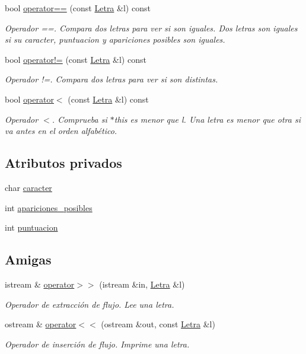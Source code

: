 \begin{DoxyCompactItemize}
bool \hyperlink{classLetra_a22103d3a6d8b9bd95c95bf5d60909b4a}{operator==} (const \hyperlink{classLetra}{Letra} \&l) const
\begin{DoxyCompactList}\small\item\em Operador ==. Compara dos letras para ver si son iguales. Dos letras son iguales si su caracter, puntuacion y apariciones posibles son iguales. \end{DoxyCompactList}\item 
bool \hyperlink{classLetra_aa9b95b0a0885994f0f7db4c4272dfe79}{operator!=} (const \hyperlink{classLetra}{Letra} \&l) const
\begin{DoxyCompactList}\small\item\em Operador !=. Compara dos letras para ver si son distintas. \end{DoxyCompactList}\item 
bool \hyperlink{classLetra_a3f648256284f628aa6fbcf63a2bf68ec}{operator$<$} (const \hyperlink{classLetra}{Letra} \&l) const
\begin{DoxyCompactList}\small\item\em Operador $<$. Comprueba si $\ast$this es menor que l. Una letra es menor que otra si va antes en el orden alfabético. \end{DoxyCompactList}\end{DoxyCompactItemize}
\subsection*{Atributos privados}
\begin{DoxyCompactItemize}
\item 
char \hyperlink{classLetra_ac279abbe29274f9de8e8a51b1f8c1f50}{caracter}
\item 
int \hyperlink{classLetra_a2aa1db254581132a0846e132ab369104}{apariciones\+\_\+posibles}
\item 
int \hyperlink{classLetra_a679c32bc028d79f633128de6c5971ae5}{puntuacion}
\end{DoxyCompactItemize}
\subsection*{Amigas}
\begin{DoxyCompactItemize}
\item 
istream \& \hyperlink{classLetra_a98ae2f1699b9cc4ef8a9300fc0a2ffe9}{operator$>$$>$} (istream \&in, \hyperlink{classLetra}{Letra} \&l)
\begin{DoxyCompactList}\small\item\em Operador de extracción de flujo. Lee una letra. \end{DoxyCompactList}\item 
ostream \& \hyperlink{classLetra_afdb7bfcba756230db41730558d5647ca}{operator$<$$<$} (ostream \&out, const \hyperlink{classLetra}{Letra} \&l)
\begin{DoxyCompactList}\small\item\em Operador de inserción de flujo. Imprime una letra. \end{DoxyCompactList}\end{DoxyCompactItemize}


